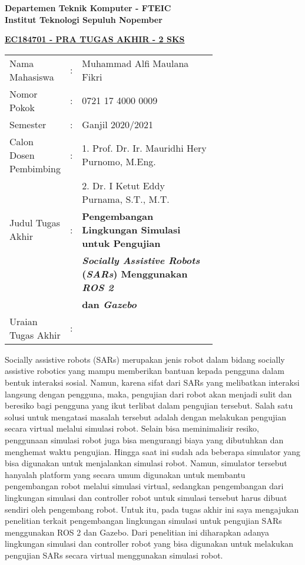 \begin{flushleft}
  \textbf{Departemen Teknik Komputer - FTEIC}\\
  \textbf{Institut Teknologi Sepuluh Nopember}\\
\end{flushleft}

\begin{center}
  \underline{\textbf{EC184701 - PRA TUGAS AKHIR - 2 SKS}}
\end{center}

\begin{adjustwidth}{-0.2cm}{}
  \begin{tabular}{lcp{0.7\linewidth}}

    Nama Mahasiswa &:& Muhammad Alfi Maulana Fikri \\
    Nomor Pokok &:&	0721 17 4000 0009 \\

    Semester &:& Ganjil 2020/2021 \\

    Calon Dosen Pembimbing &:& 1. Prof. Dr. Ir. Mauridhi Hery Purnomo, M.Eng. \\
    & & 2. Dr. I Ketut Eddy Purnama, S.T., M.T. \\

    Judul Tugas Akhir &:& \textbf{Pengembangan Lingkungan Simulasi untuk Pengujian} \\
    & & \textbf{\emph{Socially Assistive Robots} (\emph{SARs}) Menggunakan \emph{ROS 2}} \\
    & & \textbf{dan \emph{Gazebo}} \\

    Uraian Tugas Akhir &:& \\
  \end{tabular}
\end{adjustwidth}

Socially assistive robots (SARs) merupakan jenis robot dalam bidang socially assistive robotics yang mampu memberikan bantuan kepada pengguna dalam bentuk interaksi sosial.
Namun, karena sifat dari SARs yang melibatkan interaksi langsung dengan pengguna, maka, pengujian dari robot akan menjadi sulit dan beresiko bagi pengguna yang ikut terlibat dalam pengujian tersebut.
Salah satu solusi untuk mengatasi masalah tersebut adalah dengan melakukan pengujian secara virtual melalui simulasi robot.
Selain bisa meminimalisir resiko, penggunaan simulasi robot juga bisa mengurangi biaya yang dibutuhkan dan menghemat waktu pengujian.
Hingga saat ini sudah ada beberapa simulator yang bisa digunakan untuk menjalankan simulasi robot.
Namun, simulator tersebut hanyalah platform yang secara umum digunakan untuk membantu pengembangan robot melalui simulasi virtual, sedangkan pengembangan dari lingkungan simulasi dan controller robot untuk simulasi tersebut harus dibuat sendiri oleh pengembang robot.
Untuk itu, pada tugas akhir ini saya mengajukan penelitian terkait pengembangan lingkungan simulasi untuk pengujian SARs menggunakan ROS 2 dan Gazebo.
Dari penelitian ini diharapkan adanya lingkungan simulasi dan controller robot yang bisa digunakan untuk melakukan pengujian SARs secara virtual menggunakan simulasi robot.
\vspace{1ex}

